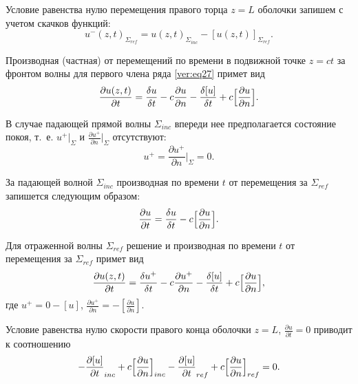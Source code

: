 Условие равенства нулю перемещения правого торца $z=L$  оболочки запишем с учетом скачков функций:
\begin{equation}
\label{ver:eq28}
u^{-}(z,t)_{\Sigma_{ref}}=u(z,t)_{\Sigma_{inc}}-[u(z,t)]_{\Sigma_{ref}}.
\end{equation}

Производная (частная) от перемещений по времени в подвижной точке $z=ct$  за фронтом волны для первого члена ряда \eqref{ver:eq27} примет вид
\begin{equation}
\label{ver:eq29}
\frac{\partial u(z,t)}{\partial t}=\frac{\delta u}{\delta t}-c\frac{\partial u}{\partial n}-\frac{\delta [u]}{\delta t}+c\Bigl[\frac{\partial u}{\partial n}\Bigr].
\end{equation}

В случае падающей прямой волны $\Sigma_{inc}$ впереди нее предполагается состояние покоя, т.~е. $u^{+}\bigr|_{\Sigma}$ и $\frac{\partial u^{+}}{\partial n}\bigr|_{\Sigma}$ отсутствуют:
\begin{equation}
\label{ver:eq30}
u^{+}=\frac{\partial u^{+}}{\partial n}\Bigr|_{\Sigma}=0.
\end{equation}

За падающей волной $\Sigma_{inc}$  производная по времени $t$  от перемещения за $\Sigma_{ref}$ запишется следующим образом:
\begin{equation}
\label{ver:eq31}
\frac{\partial u}{\partial t}=\frac{\delta u}{\delta t}-c\Bigl[\frac{\partial u}{\partial n}\Bigr].
\end{equation}

Для отраженной волны $\Sigma_{ref}$ решение и производная по времени $t$ от перемещения за  $\Sigma_{ref}$ примет вид
\begin{equation}
\label{ver:eq32}
\frac{\partial u(z,t)}{\partial t}=\frac{\delta u^+}{\delta t}-c\frac{\partial u^+}{\partial n}-\frac{\delta[u]}{\delta t}+c\Bigl[\frac{\partial u}{\partial n}\Bigr],
\end{equation}
где  $u^{+}=0-[u]$, $\frac{\partial u^+}{\partial n}=-\left[\frac{\partial u}{\partial n}\right]$.

Условие равенства нулю скорости правого конца оболочки  $z=L$, $\frac{\partial u}{\partial t}=0$ приводит к соотношению
\begin{equation}
\label{ver:eq33}
-\frac{\partial [u]}{\partial t}_{inc}+c\Bigl[\frac{\partial u}{\partial n}\Bigr]_{inc}-\frac{\partial [u]}{\partial t}_{ref}+c\Bigl[\frac{\partial u}{\partial n}\Bigr]_{ref}=0. 
\end{equation} 


